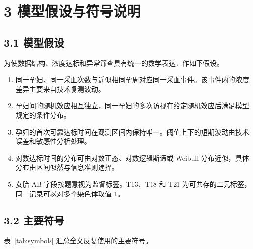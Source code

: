 \documentclass[UTF8,fontset=fandol,zihao=-4,a4paper]{ctexart}
\providecommand{\tightlist}{\setlength{\itemsep}{0pt}\setlength{\parskip}{0pt}}
\begin{document}
\section{3
模型假设与符号说明}\label{ux6a21ux578bux5047ux8bbeux4e0eux7b26ux53f7ux8bf4ux660e}

\subsection{3.1 模型假设}\label{ux6a21ux578bux5047ux8bbe}

为使数据结构、浓度达标和异常筛查具有统一的数学表达，作如下假设。

\begin{enumerate}
\def\labelenumi{\arabic{enumi}.}
\tightlist
\item
  同一孕妇、同一采血次数与近似相同孕周对应同一采血事件。该事件内的浓度差异主要来自技术复测波动。
\item
  孕妇间的随机效应相互独立，同一孕妇的多次访视在给定随机效应后满足模型规定的条件分布。
\item
  孕妇的首次可靠达标时间在观测区间内保持唯一。阈值上下的短期波动由技术误差和敏感性分析处理。
\item
  对数达标时间的分布可由对数正态、对数逻辑斯谛或 Weibull
  分布近似，具体分布由区间似然与信息准则选择。
\item
  女胎 AB 字段按题意视为监督标签。T13、T18 和 T21
  为可共存的二元标签，同一记录可以对多个染色体取值 1。
\end{enumerate}

\subsection{3.2 主要符号}\label{ux4e3bux8981ux7b26ux53f7}

表~\ref{tab:symbols} 汇总全文反复使用的主要符号。
\end{document}
